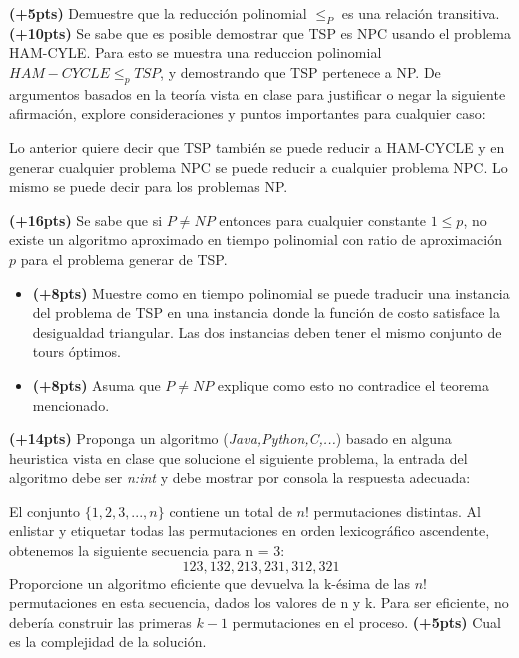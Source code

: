 \documentclass[12pt, a4paper]{exam}
\begin{document}
\begin{questions}
	\pointsdroppedatright
	\question \textbf{(+5pts)} Demuestre que la reducción polinomial $\leq_P$ es una relación transitiva.
	\question \textbf{(+10pts)} Se sabe que es posible demostrar que TSP es NPC usando el problema HAM-CYLE.
	Para esto se muestra una reduccion polinomial $HAM-CYCLE \leq_p TSP$, y demostrando que TSP
	pertenece a NP. De argumentos basados en la teoría vista en clase para justificar o 
	negar la siguiente afirmación, explore consideraciones y puntos importantes para cualquier caso:
	
		Lo anterior quiere decir que TSP también se puede reducir a HAM-CYCLE y en generar
		cualquier problema NPC se puede reducir  a cualquier problema NPC. Lo mismo se puede 
		decir para los problemas NP.

    \question \textbf{(+16pts)} Se sabe que si $P \not = NP$ entonces para cualquier constante 
	$1 \leq p$, no existe un algoritmo aproximado en tiempo polinomial  con ratio de aproximación 
	$p$ para el problema generar de TSP. 
	\begin{itemize}
		\item \textbf{(+8pts)} Muestre como en tiempo polinomial se puede traducir una 
		instancia del problema de TSP en una instancia donde la función de costo satisface la desigualdad
		triangular. Las dos instancias deben tener el mismo conjunto de tours óptimos. 
		\item \textbf{(+8pts)} Asuma que $P \not = NP$ explique como esto no contradice el teorema mencionado. 
	\end{itemize}
    \question \textbf{(+14pts)} Proponga un algoritmo (\textit{Java,Python,C,...}) basado en alguna heuristica
	vista en clase que solucione el siguiente problema, la entrada del algoritmo debe ser \textit{n:int} 
	y debe mostrar por consola la respuesta adecuada:

	El conjunto $\{1, 2, 3, ..., n\}$ contiene un total de $n!$ permutaciones distintas. 
	Al enlistar y etiquetar todas las permutaciones en orden lexicográfico ascendente, 
	obtenemos la siguiente secuencia para n = 3:
		\[ 123, 132, 213, 231, 312, 321 \]
	Proporcione un algoritmo eficiente que devuelva la k-ésima de las $n!$ permutaciones 
	en esta secuencia, dados los valores de n y k. Para ser eficiente, no debería 
	construir las primeras $k-1$ permutaciones en el proceso. \textbf{(+5pts)} Cual es la complejidad de la solución.
	

\end{questions}
\end{document}
